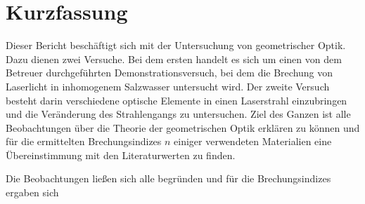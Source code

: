 \section{Kurzfassung}

	Dieser Bericht beschäftigt sich mit der Untersuchung von geometrischer Optik.
	Dazu dienen zwei Versuche.
	Bei dem ersten handelt es sich um einen von dem Betreuer durchgeführten Demonstrationsversuch, bei dem die Brechung von Laserlicht in inhomogenem Salzwasser untersucht wird.
	Der zweite Versuch besteht darin verschiedene optische Elemente in einen Laserstrahl einzubringen und die Veränderung des Strahlengangs zu untersuchen.
	Ziel des Ganzen ist alle Beobachtungen über die Theorie der geometrischen Optik erklären zu können und für die ermittelten Brechungsindizes $n$ einiger verwendeten Materialien eine Übereinstimmung mit den Literaturwerten zu finden. 
	
	Die Beobachtungen ließen sich alle begründen und für die Brechungsindizes ergaben sich %